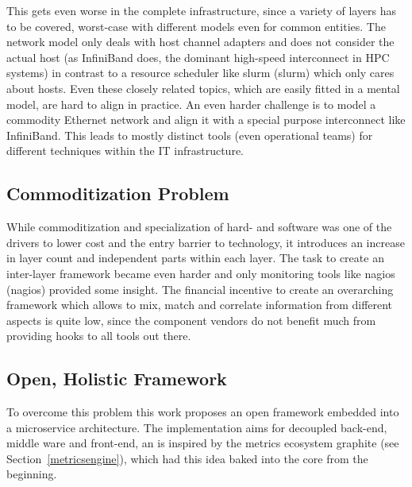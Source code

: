 This gets even worse in the complete infrastructure, since a variety of layers has to be covered, worst-case with different models even for common entities.
The network model only deals with host channel adapters and does not consider the actual host (as InfiniBand does, the dominant high-speed interconnect in HPC systems) in contrast to a resource
scheduler like \gls{slurm} (\glsdesc{slurm}) which only cares about hosts. Even these closely related topics, which are easily fitted
in a mental model, are hard to align in practice. An even harder challenge is to model a commodity Ethernet network and align it with a special purpose interconnect like InfiniBand.
This leads to mostly distinct tools (even operational teams) for different techniques within the IT infrastructure.

\subsection{Commoditization Problem}
While commoditization and specialization of hard- and software was one of the drivers to lower cost and the entry barrier to technology, it
introduces an increase in layer count and
independent parts within each layer. The task to create an inter-layer framework became even harder and only monitoring tools like \gls{nagios} (\glsdesc{nagios}) provided some insight.
The financial incentive to create an overarching framework which allows to mix, match and correlate information from different aspects is quite low, since the component vendors
do not benefit much from providing hooks to all tools out there.

\subsection{Open, Holistic Framework}
To overcome this problem this work proposes an open framework embedded into a microservice architecture. The implementation aims for decoupled back-end, middle ware and front-end,
an is inspired by the metrics ecosystem \gls{graphite} (see Section~\ref{metricsengine}), which had this idea baked into the core from the beginning.

